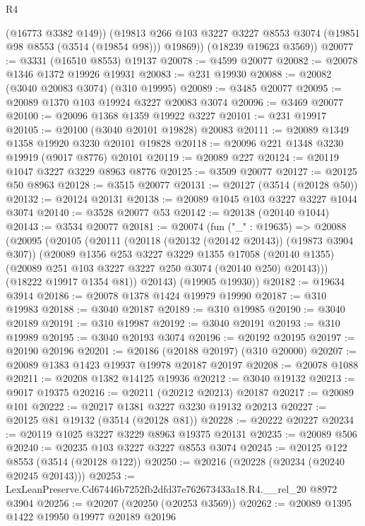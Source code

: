 \begin{lexlean}{R4}
\begin{coremodule}
          (@16773 @3382 @149))
        (@19813 @266 @103 @3227 @3227 @8553 @3074 (@19851 @98 @8553 (@3514 (@19854 @98))) @19869))
      (@18239 @19623 @3569))
@20077 := @3331 (@16510 @8553) @19137
@20078 := @4599 @20077
@20082 := @20078 @1346 @1372 @19926 @19931
@20083 := @231 @19930
@20088 := @20082 (@3040 @20083 @3074) (@310 @19995)
@20089 := @3485 @20077
@20095 := @20089 @1370 @103 @19924 @3227 @20083 @3074
@20096 := @3469 @20077
@20100 := @20096 @1368 @1359 @19922 @3227
@20101 := @231 @19917
@20105 := @20100 (@3040 @20101 @19828) @20083
@20111 := @20089 @1349 @1358 @19920 @3230 @20101 @19828
@20118 := @20096 @221 @1348 @3230 @19919 (@9017 @8776) @20101
@20119 := @20089 @227
@20124 := @20119 @1047 @3227 @3229 @8963 @8776
@20125 := @3509 @20077
@20127 := @20125 @50 @8963
@20128 := @3515 @20077
@20131 := @20127 (@3514 (@20128 @50))
@20132 := @20124 @20131
@20138 := @20089 @1045 @103 @3227 @3227 @1044 @3074
@20140 := @3528 @20077 @53
@20142 := @20138 (@20140 @1044)
@20143 := @3534 @20077
@20181 := @20074
    (fun ("_" : @19635) =>
    @20088
      (@20095
        (@20105
          (@20111
            (@20118 (@20132 (@20142 @20143)) (@19873 @3904 @307))
            (@20089
              @1356
              @253
              @3227
              @3229
              @1355
              @17058
              (@20140 @1355)
              (@20089 @251 @103 @3227 @3227 @250 @3074 (@20140 @250) @20143)))
          (@18222 @19917 @1354 @81))
        @20143)
      (@19905 @19930))
@20182 := @19634 @3914
@20186 := @20078 @1378 @1424 @19979 @19990
@20187 := @310 @19983
@20188 := @3040 @20187
@20189 := @310 @19985
@20190 := @3040 @20189
@20191 := @310 @19987
@20192 := @3040 @20191
@20193 := @310 @19989
@20195 := @3040 @20193 @3074
@20196 := @20192 @20195
@20197 := @20190 @20196
@20201 := @20186 (@20188 @20197) (@310 @20000)
@20207 := @20089 @1383 @1423 @19937 @19978 @20187 @20197
@20208 := @20078 @1088
@20211 := @20208 @1382 @14125 @19936
@20212 := @3040 @19132
@20213 := @9017 @19375
@20216 := @20211 (@20212 @20213) @20187
@20217 := @20089 @101
@20222 := @20217 @1381 @3227 @3230 @19132 @20213
@20227 := @20125 @81 @19132 (@3514 (@20128 @81))
@20228 := @20222 @20227
@20234 := @20119 @1025 @3227 @3229 @8963 @19375 @20131
@20235 := @20089 @506
@20240 := @20235 @103 @3227 @3227 @8553 @3074
@20245 := @20125 @122 @8553 (@3514 (@20128 @122))
@20250 := @20216 (@20228 (@20234 (@20240 @20245 @20143)))
@20253 := LexLeanPreserve.Cd67446b7252fb2dfd37e762673433a18.R4.__rel_20 @8972 @3904
@20256 := @20207 (@20250 (@20253 @3569))
@20262 := @20089 @1395 @1422 @19950 @19977 @20189 @20196

\end{coremodule}
\end{lexlean}

